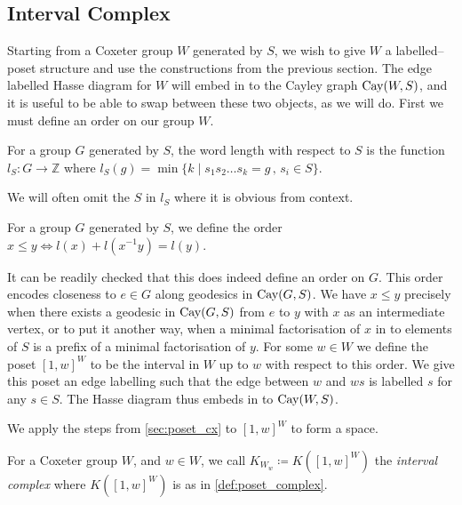 \documentclass[class=article, crop=false]{standalone}
\begin{document}
\subsection{Interval Complex}

Starting from a Coxeter group $W$ generated by $S$, we wish to give $W$ a labelled--poset structure and use the constructions from the previous section. The edge labelled Hasse diagram for $W$ will embed in to the Cayley graph $\text{Cay}(W,S)$, and it is useful to be able to swap between these two objects, as we will do. First we must define an order on our group $W$.
\begin{definition}
    For a group $G$ generated by $S$, the word length with respect to $S$ is the function $l_S:G\to \mathbb{Z}$ where $l_S(g) = \min\{k \mid s_1s_2\ldots s_k=g \,,\, s_i \in S \}$.
\end{definition}

We will often omit the $S$ in $l_S$ where it is obvious from context.

\begin{definition}
    For a group $G$ generated by $S$, we define the order $x \leq y \iff l(x) + l(x^{-1}y) = l(y)$.
\end{definition}

It can be readily checked that this does indeed define an order on $G$. This order encodes closeness to $e \in G$ along geodesics in $\text{Cay}(G,S)$. We have $x \leq y$ precisely when there exists a geodesic in $\text{Cay}(G, S)$ from $e$ to $y$ with $x$ as an intermediate vertex, or to put it another way, when a minimal factorisation of $x$ in to elements of $S$ is a prefix of a minimal factorisation of $y$.
For some $w \in W$ we define the poset $[1,w]^W$ to be the interval in $W$ up to $w$ with respect to this order. We give this poset an edge labelling such that the edge between $w$ and $ws$ is labelled $s$ for any $s \in S$. The Hasse diagram thus embeds in to $\text{Cay}(W,S)$.

We apply the steps from \cref{sec:poset_cx} to $[1,w]^W$ to form a space.

\begin{definition}
    For a Coxeter group $W$, and $w \in W$, we call $K_{W_w} \coloneq K([1,w]^W)$ the \emph{interval complex} where $K([1,w]^W)$ is as in \cref{def:poset_complex}.
\end{definition}
\end{document}

